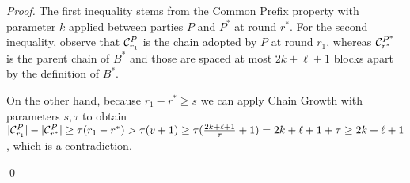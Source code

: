 \begin{proof}
  The first inequality stems from the Common Prefix property with parameter $k$ applied
  between parties $P$ and $P^*$ at round $r^*$. For the second inequality, observe that
  $\mathcal{C}^P_{r_1}$ is the chain adopted by $P$ at round $r_1$, whereas $\mathcal{C}^{P^*}_{r^*}$ is
  the parent chain of $B^*$ and those are spaced at most $2k + \ell + 1$ blocks apart by the definition
  of $B^*$.

  On the other hand, because $r_1 - r^* \geq s$ we can apply Chain Growth with parameters
  $s, \tau$ to obtain
  $|\mathcal{C}^P_{r_1}| - |\mathcal{C}^P_{r^*}| \geq \tau(r_1 - r^*) > \tau (v + 1) \geq
  \tau (\frac{2k + \ell + 1}{\tau} + 1) = 2k + \ell + 1 + \tau \geq 2k + \ell + 1$,
  which is a contradiction.

  \qed
\end{proof}